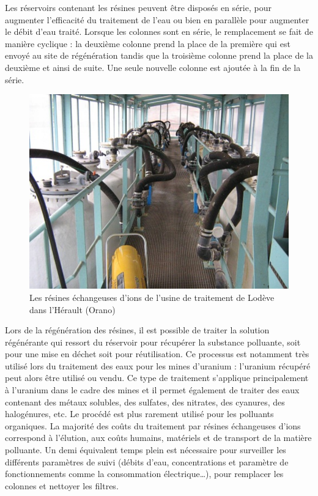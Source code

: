 \documentclass{article}
\begin{document}
Les réservoirs contenant les résines peuvent être disposés en série, pour augmenter l’efficacité du traitement de l’eau ou bien en parallèle pour augmenter le débit d’eau traité. Lorsque les colonnes sont en série, le remplacement se fait de manière cyclique : la deuxième colonne prend la place de la première qui est envoyé au site de régénération tandis que la troisième colonne prend la place de la deuxième et ainsi de suite. Une seule nouvelle colonne est ajoutée à la fin de la série. %

\begin{figure}[H]
\centering
\includegraphics[width=0.6\linewidth]{III_A_3.png}
\caption{Les résines échangeuses d'ions de l'usine de traitement de Lodève dans l'Hérault (Orano)}
\label{fig:usine_traitement_resines}
\end{figure}

Lors de la régénération des résines, il est possible de traiter la solution régénérante qui ressort du réservoir pour récupérer la substance polluante, soit pour une mise en déchet soit pour réutilisation. Ce processus est notamment très utilisé lors du traitement des eaux pour les mines d’uranium : l’uranium récupéré peut alors être utilisé ou vendu.
Ce type de traitement s’applique principalement à l’uranium dans le cadre des mines et il permet également de traiter des eaux contenant des métaux solubles, des sulfates, des nitrates, des cyanures, des halogénures, etc. Le procédé est plus rarement utilisé pour les polluants organiques.
La majorité des coûts du traitement par résines échangeuses d’ions correspond à l’élution, aux coûts humains, matériels et de transport de la matière polluante. Un demi équivalent temps plein est nécessaire pour surveiller les différents paramètres de suivi (débits d’eau, concentrations et paramètre de fonctionnements comme la consommation électrique…), pour remplacer les colonnes et nettoyer les filtres.
\end{document}
